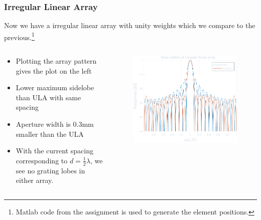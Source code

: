 \documentclass[compress]{beamer}
\begin{document}
\begin{frame} %
    \frametitle{Irregular Linear Array}
    Now we have a irregular linear array with unity weights which we compare to
    the previous.\footnote{\tiny Matlab code from the assignment is used to generate 
    the element positions.}
    \begin{columns}
        \begin{column}{0.5\textwidth}
            \begin{itemize}
                \item Plotting the array pattern gives the plot on the left
                \item Lower maximum sidelobe than ULA with same spacing
                \item Aperture width is 0.3mm smaller than the ULA
                \item With the current spacing corresponding to $d=\frac{1}{2}\lambda$,
                    we see no grating lobes in either array.
            \end{itemize}
        \end{column}
        \begin{column}{0.5\textwidth}
            \begin{figure}
                \includegraphics[width=\columnwidth]{"../6a.pdf"}
            \end{figure}
        \end{column}
    \end{columns}
\end{frame} %
\end{document}
